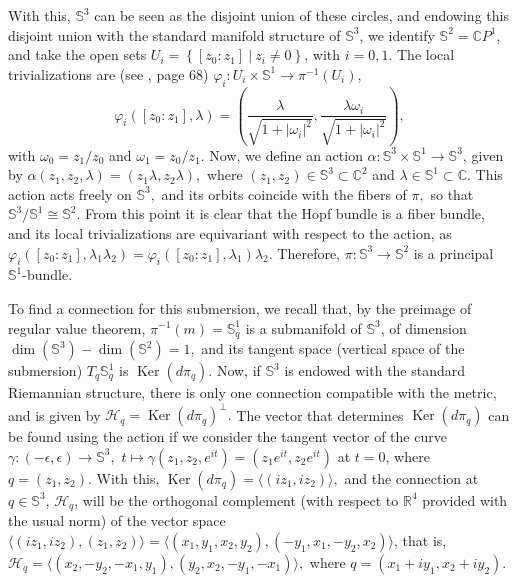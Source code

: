 \documentclass[12pt, letterpaper, reqno]{amsart}
\theoremstyle{definition}
\theoremstyle{plain}
\theoremstyle{remark}
\begin{document}
	With this, $ \mathbb{S}^3 $ can be seen as the disjoint union of these circles, and endowing this disjoint union with the standard manifold structure of $ \mathbb{S}^3 $, we identify $ \mathbb{S}^2 = \mathbb{C}P^1$, and take the open sets $ U_i= \left\{ \left[ z_0 : z_1 \right]\ | \ z_i\neq 0 \right\}$, with $ i=0,1. $ The local trivializations are (see \cite{luke2013vector}, page 68) $ \varphi_i: U_i \times \mathbb{S}^1 \rightarrow \pi^{-1}(U_i), $ $$ \varphi_i([z_0:z_1], \lambda) = \left( \frac{\lambda}{\sqrt{1+|\omega_i|^2}}, \frac{\lambda\omega_i}{\sqrt{1+|\omega_i|^2}}   \right), $$ with $ \omega_0=z_1/z_0 $ and $ \omega_1 = z_0/z_1. $ Now, we define an action $ \alpha: \mathbb{S}^3\times \mathbb{S}^1 \rightarrow { \mathbb{S}^3}
	$, given by $ \alpha(z_1,z_2,\lambda) = (z_1\lambda, z_2\lambda), $ where $ (z_1,z_2)\in \mathbb{S}^3\subset \mathbb{C}^2 $ and $ \lambda\in \mathbb{S}^1 \subset \mathbb{C}. $ This action acts freely on $ \mathbb{S}^3, $ and its orbits coincide with the fibers of $ \pi, $ so that $ \mathbb{S}^3/ \mathbb{S}^1 \cong \mathbb{S}^2. $ From this point it is clear that the Hopf bundle is a fiber bundle, and its local trivializations are equivariant with respect to the action, as $ \varphi_i([z_0:z_1], \lambda_1\lambda_2) = \varphi_i([z_0:z_1], \lambda_1)\lambda_2. $ Therefore, $ \pi: \mathbb{S}^3 \rightarrow { \mathbb{S}^2} $ is a principal $ \mathbb{S}^1$-bundle.

	To find a connection for this submersion, we recall that, by the preimage of regular value theorem, $ \pi^{-1}(m) = \mathbb{S}^1_q $ is a submanifold of $ \mathbb{S}^3 $, of dimension $ \operatorname{dim}( \mathbb{S}^3)- \operatorname{dim}( \mathbb{S}^2) = 1,  $ and its tangent space (vertical space of the submersion) $ T_q \mathbb{S}^1_q $ is $ \operatorname{Ker}(d\pi_q)  $. Now, if $ \mathbb{S}^3 $ is endowed with the standard Riemannian structure, there is only one connection compatible with the metric, and is given by $ \mathcal{H}_q = \operatorname{Ker}(d\pi_q)^\perp. $ The vector that determines $ \operatorname{Ker}(d\pi_q)  $ can be found using the action if we consider the tangent vector of the curve $ \gamma: (-\epsilon, \epsilon) \rightarrow \mathbb{S}^3, $ $ t\mapsto \gamma(z_1,z_2, e^{it})=(z_1e^{it},z_2e^{it}) $ at $ t=0 $, where $ q=(z_1,z_2). $ With this, $ \operatorname{Ker}(d\pi_q) = \langle(iz_1, iz_2)\rangle,  $ and the connection at $ q\in \mathbb{S}^3 $,  $ \mathcal{H}_q $, will be the orthogonal complement (with respect to $ \mathbb{R}^4 $ provided with the usual norm) of the vector space $ \langle(iz_1,iz_2), (z_1,z_2)\rangle  {= \langle(x_1,y_1,x_2,y_2), (-y_1,x_1,-y_2,x_2)\rangle}$, that is, $ \mathcal{H}_q = \langle(x_2,-y_2,-x_1,y_1),(y_2,x_2,-y_1,-x_1)\rangle, $ where $ q=(x_1+iy_1, x_2+iy_2). $   
\end{document}
